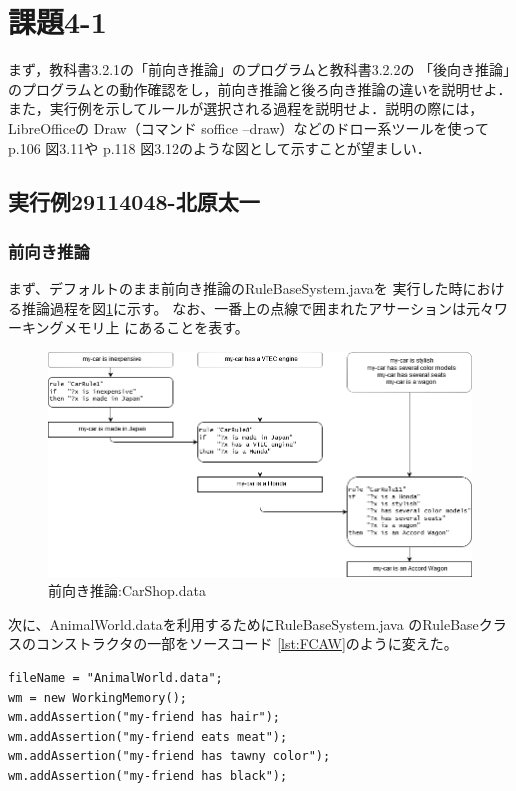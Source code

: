 \documentclass{jarticle}
\begin{document}
\section{課題4-1}
\begin{screen}
    まず，教科書3.2.1の「前向き推論」のプログラムと教科書3.2.2の
    「後向き推論」のプログラムとの動作確認をし，前向き推論と後ろ向き推論の違いを説明せよ．
    また，実行例を示してルールが選択される過程を説明せよ．説明の際には，LibreOfficeの
    Draw（コマンド soffice --draw）などのドロー系ツールを使ってp.106 図3.11や
    p.118 図3.12のような図として示すことが望ましい．
\end{screen}
\subsection{実行例29114048-北原太一}
\subsubsection{前向き推論}
まず、デフォルトのまま前向き推論のRuleBaseSystem.javaを
実行した時における推論過程を図\ref{fig:FCCS}に示す。
なお、一番上の点線で囲まれたアサーションは元々ワーキングメモリ上
にあることを表す。

 \begin{figure}[htbp]
\includegraphics[scale=0.35]{048/Forward1.png}
\caption{前向き推論:CarShop.data}
\label{fig:FCCS}
\end{figure}

次に、AnimalWorld.dataを利用するためにRuleBaseSystem.java
のRuleBaseクラスのコンストラクタの一部をソースコード
\ref{lst:FCAW}のように変えた。

  \begin{lstlisting}[caption=RuleBase2.java(一部抜粋),label=lst:FCAW]
fileName = "AnimalWorld.data";
wm = new WorkingMemory();
wm.addAssertion("my-friend has hair");
wm.addAssertion("my-friend eats meat");
wm.addAssertion("my-friend has tawny color");
wm.addAssertion("my-friend has black");
  \end{lstlisting}
  
\end{document}
